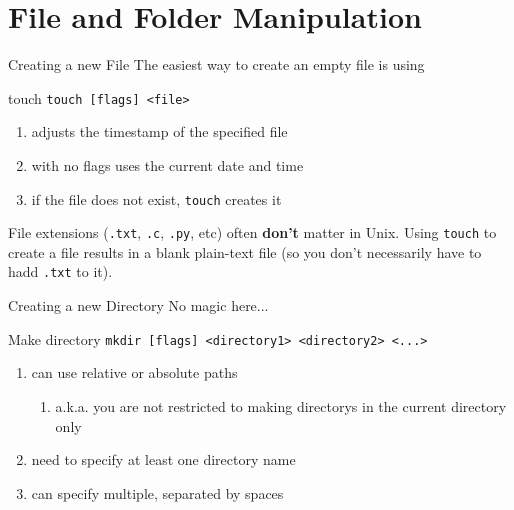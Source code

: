 \documentclass[11pt]{beamer}
\newcommand{\colbf}[1]{\textcolor{mLightBrown!77!black}{#1}}%
\begin{document}
%
\section{File and Folder Manipulation}
\label{sec:file_and_folder_manipulation}

\begin{frame}[fragile]{Creating a new File}
  The easiest way to create an empty file is using

  \begin{block}{\colbf{touch}}
    \texttt{touch [flags] <file>}
    \begin{enumerate}[\--]
      \item adjusts the timestamp of the specified file
      \item with no flags uses the current date and time
      \item if the file does not exist, \texttt{touch} creates it
    \end{enumerate}
    \vspace*{1em}
  \end{block}

  File extensions (\texttt{.txt}, \texttt{.c}, \texttt{.py}, etc) often \textbf{don't} matter in Unix.
  Using \texttt{touch} to create a file results in a blank plain-text file (so you don't necessarily
  have to hadd \texttt{.txt} to it).
\end{frame}

\begin{frame}[fragile]{Creating a new Directory}
  No magic here...

  \begin{block}{\colbf{M}a\colbf{k}e \colbf{dir}ectory}
    \texttt{mkdir [flags] <directory1> <directory2> <...>}
    \begin{enumerate}[\--]
      \item can use relative or absolute paths
      \begin{enumerate}[\--]
        \item a.k.a. you are not restricted to making directorys in the current directory only
      \end{enumerate}
      \item need to specify at least one directory name
      \item can specify multiple, separated by spaces
    \end{enumerate}
    \vspace*{1em}
  \end{block}
\end{frame}
\end{document}
